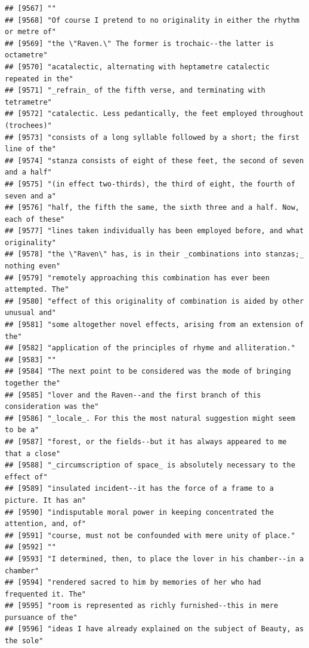 \documentclass{article}\usepackage[]{graphicx}\usepackage[]{color}
\makeatletter
\newenvironment{kframe}{%
 \def\at@end@of@kframe{}%
 \ifinner\ifhmode%
  \def\at@end@of@kframe{\end{minipage}}%
  \begin{minipage}{\columnwidth}%
 \fi\fi%
 \def\FrameCommand##1{\hskip\@totalleftmargin \hskip-\fboxsep
 \colorbox{shadecolor}{##1}\hskip-\fboxsep
     \hskip-\linewidth \hskip-\@totalleftmargin \hskip\columnwidth}%
 \MakeFramed {\advance\hsize-\width
   \@totalleftmargin\z@ \linewidth\hsize
   \@setminipage}}%
 {\par\unskip\endMakeFramed%
 \at@end@of@kframe}
\newenvironment{knitrout}{}{} %
\makeatother
\begin{document}
\begin{knitrout}
\begin{kframe}
\begin{verbatim}
## [9567] ""                                                                            
## [9568] "Of course I pretend to no originality in either the rhythm or metre of"      
## [9569] "the \"Raven.\" The former is trochaic--the latter is octametre"              
## [9570] "acatalectic, alternating with heptametre catalectic repeated in the"         
## [9571] "_refrain_ of the fifth verse, and terminating with tetrametre"               
## [9572] "catalectic. Less pedantically, the feet employed throughout (trochees)"      
## [9573] "consists of a long syllable followed by a short; the first line of the"      
## [9574] "stanza consists of eight of these feet, the second of seven and a half"      
## [9575] "(in effect two-thirds), the third of eight, the fourth of seven and a"       
## [9576] "half, the fifth the same, the sixth three and a half. Now, each of these"    
## [9577] "lines taken individually has been employed before, and what originality"     
## [9578] "the \"Raven\" has, is in their _combinations into stanzas;_ nothing even"    
## [9579] "remotely approaching this combination has ever been attempted. The"          
## [9580] "effect of this originality of combination is aided by other unusual and"     
## [9581] "some altogether novel effects, arising from an extension of the"             
## [9582] "application of the principles of rhyme and alliteration."                    
## [9583] ""                                                                            
## [9584] "The next point to be considered was the mode of bringing together the"       
## [9585] "lover and the Raven--and the first branch of this consideration was the"     
## [9586] "_locale_. For this the most natural suggestion might seem to be a"           
## [9587] "forest, or the fields--but it has always appeared to me that a close"        
## [9588] "_circumscription of space_ is absolutely necessary to the effect of"         
## [9589] "insulated incident--it has the force of a frame to a picture. It has an"     
## [9590] "indisputable moral power in keeping concentrated the attention, and, of"     
## [9591] "course, must not be confounded with mere unity of place."                    
## [9592] ""                                                                            
## [9593] "I determined, then, to place the lover in his chamber--in a chamber"         
## [9594] "rendered sacred to him by memories of her who had frequented it. The"        
## [9595] "room is represented as richly furnished--this in mere pursuance of the"      
## [9596] "ideas I have already explained on the subject of Beauty, as the sole"        

\end{verbatim}
\end{kframe}
\end{knitrout}
\end{document}
